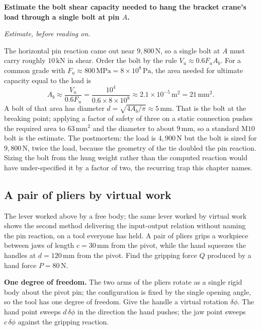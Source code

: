 \begin{estimation}
\textbf{Estimate the bolt shear capacity needed to hang the bracket
crane's load through a single bolt at pin $A$.}

\smallskip
\textit{Estimate, before reading on.}

\smallskip
The horizontal pin reaction came out near $9{,}800\,\text{N}$, so a
single bolt at $A$ must carry roughly $10\,\text{kN}$ in shear. Order
the bolt by the rule $V_u \approx 0.6 F_u A_b$. For a common
grade with $F_u \approx 800\,\text{MPa} = 8 \times 10^{8}\,\text{Pa}$,
the area needed for ultimate capacity equal to the load is
\[
A_b \approx \frac{V_u}{0.6 F_u} =
\frac{10^{4}}{0.6 \times 8 \times 10^{8}}
\approx 2.1 \times 10^{-5}\,\si{\meter\squared}
= 21\,\si{\milli\meter\squared}.
\]
A bolt of that area has diameter $d = \sqrt{4 A_b / \pi}
\approx 5\,\si{\milli\meter}$. That is the bolt at the breaking point;
applying a factor of safety of three on a static connection pushes the
required area to $63\,\si{\milli\meter\squared}$ and the diameter to
about $9\,\si{\milli\meter}$, so a standard $\text{M10}$ bolt is the
estimate. The postmortem: the load is $4{,}900\,\text{N}$ but the bolt
is sized for $9{,}800\,\text{N}$, twice the load, because the geometry
of the tie doubled the pin reaction. Sizing the bolt from the hung
weight rather than the computed reaction would have under-specified it
by a factor of two, the recurring trap this chapter names.
\end{estimation}

\subsection{A pair of pliers by virtual work}

The lever worked above by a free body; the same lever worked by virtual
work shows the second method delivering the input-output relation without
naming the pin reaction, on a tool everyone has held. A pair of pliers
grips a workpiece between jaws of length $c = 30\,\si{\milli\meter}$ from
the pivot, while the hand squeezes the handles at $d = 120\,\si{
\milli\meter}$ from the pivot. Find the gripping force $Q$ produced by a
hand force $P = 80\,\text{N}$.

\textbf{One degree of freedom.} The two arms of the pliers rotate as a
single rigid body about the pivot pin; the configuration is fixed by the
single opening angle, so the tool has one degree of freedom. Give the
handle a virtual rotation $\delta\phi$. The hand point sweeps
$d\,\delta\phi$ in the direction the hand pushes; the jaw point sweeps
$c\,\delta\phi$ against the gripping reaction.

